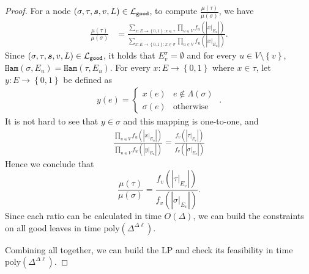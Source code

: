 \documentclass[11pt]{article}
\newcommand{\abs}[1]{\left\vert#1\right\vert}
\newcommand{\set}[1]{\left\{#1\right\}}
\def\!#1{\mathtt{#1}}
\def\poly{\mathrm{poly}}
\newcommand{\Ham}{\!{Ham}}
\newcommand{\seqS}{\boldsymbol{s}}
\begin{document}
\begin{proof}
    For a node $(\sigma, \tau, \seqS, v, L) \in \+L_{\!{good}}$, to compute $\frac{\mu(\tau)}{\mu(\sigma)}$, we have
    \begin{align*}
        \frac{\mu(\tau)}{\mu(\sigma)} &= \frac{\sum_{x : E \to \set{0, 1} : x \in \tau} \prod_{u \in V} f_u\left(\abs{x \vert_{E_u}}\right)}{\sum_{x : E \to \set{0, 1} : x \in \sigma} \prod_{u \in V} f_u\left(\abs{x \vert_{E_u}}\right)}.
    \end{align*}
    Since $(\sigma, \tau, \seqS, v, L) \in \+L_{\!{good}}$, it holds that $E_v^{\sigma} = \emptyset$ and for every $u \in V \setminus \set{v}$, $\Ham(\sigma, E_u) = \Ham(\tau, E_u)$. For every $x : E \to \set{0, 1}$ where $x \in \tau$, let $y : E \to \set{0, 1}$ be defined as
    \begin{align*}
        y(e) = \begin{cases}
            x(e) & e \notin \Lambda(\sigma) \\
            \sigma(e) & \mbox{otherwise}
        \end{cases}\;.
    \end{align*}
    It is not hard to see that $y \in \sigma$ and this mapping is one-to-one, and
    \begin{align*}
        \frac{\prod_{u \in V} f_u\left(\abs{x \vert_{E_u}}\right)}{\prod_{u \in V} f_u\left(\abs{y \vert_{E_u}}\right)} = \frac{f_v\left(\abs{\tau \vert_{E_v}}\right)}{f_v\left(\abs{\sigma \vert_{E_v}}\right)}
    \end{align*}
    Hence we conclude that
    $$
        \frac{\mu(\tau)}{\mu(\sigma)} = \frac{f_v\left(\abs{\tau \vert_{E_v}}\right)}{f_v\left(\abs{\sigma \vert_{E_v}}\right)}.
    $$
    Since each ratio can be calculated in time $O(\Delta)$, we can build the constraints on all good leaves in time $\poly\left(\Delta^{\Delta\ell}\right)$.

    Combining all together, we can build the LP and check its feasibility in time $\poly\left(\Delta^{\Delta\ell}\right)$.
\end{proof}
\end{document}
